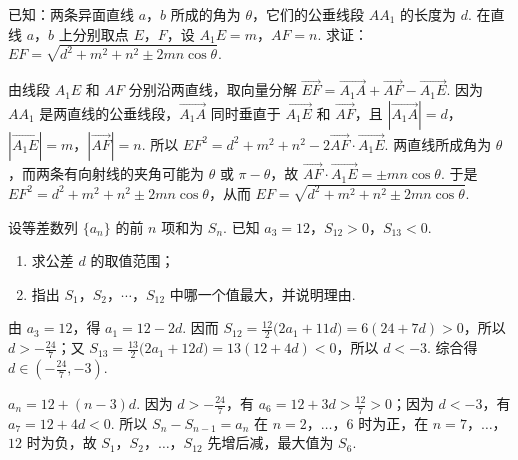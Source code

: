 \documentclass[UTF8,a4paper,oneside,11pt]{ctexbook}
\begin{document}
\begin{problem}
已知：两条异面直线 \(a\)，\(b\) 所成的角为 \(\theta\)，它们的公垂线段 \(AA_1\) 的长度为 \(d\). 在直线 \(a\)，\(b\) 上分别取点 \(E\)，\(F\)，设 \(A_1E=m\)，\(AF=n\). 求证：\(EF=\sqrt{d^2+m^2+n^2\pm 2mn\cos\theta}\).

\begin{solution}
由线段 \(A_1E\) 和 \(AF\) 分别沿两直线，取向量分解
\(\overrightarrow{EF}=\overrightarrow{A_1A}+\overrightarrow{AF}-\overrightarrow{A_1E}\). 因为 \(AA_1\) 是两直线的公垂线段，\(\overrightarrow{A_1A}\) 同时垂直于 \(\overrightarrow{A_1E}\) 和 \(\overrightarrow{AF}\)，且 \(|\overrightarrow{A_1A}|=d\)，\(|\overrightarrow{A_1E}|=m\)，\(|\overrightarrow{AF}|=n\). 所以
\(EF^2=d^2+m^2+n^2-2\overrightarrow{AF}\cdot\overrightarrow{A_1E}\). 两直线所成角为 \(\theta\)，而两条有向射线的夹角可能为 \(\theta\) 或 \(\pi-\theta\)，故 \(\overrightarrow{AF}\cdot\overrightarrow{A_1E}=\pm mn\cos\theta\). 于是 \(EF^2=d^2+m^2+n^2\pm2mn\cos\theta\)，从而 \(EF=\sqrt{d^2+m^2+n^2\pm2mn\cos\theta}\).
\end{solution}
\end{problem}

\begin{problem}
设等差数列 \(\{a_n\}\) 的前 \(n\) 项和为 \(S_n\). 已知 \(a_3=12\)，\(S_{12}>0\)，\(S_{13}<0\).

\begin{enumerate}
\item 求公差 \(d\) 的取值范围；
\item 指出 \(S_1\)，\(S_2\)，\(\cdots\)，\(S_{12}\) 中哪一个值最大，并说明理由.
\end{enumerate}

\begin{solution}
由 \(a_3=12\)，得 \(a_1=12-2d\). 因而
\(S_{12}=\frac{12}{2}\bigl(2a_1+11d\bigr)=6(24+7d)>0\)，所以 \(d>-\frac{24}{7}\)；又
\(S_{13}=\frac{13}{2}\bigl(2a_1+12d\bigr)=13(12+4d)<0\)，所以 \(d<-3\). 综合得 \(d\in\left(-\frac{24}{7},-3\right)\).

\(a_n=12+(n-3)d\). 因为 \(d>-\frac{24}{7}\)，有 \(a_6=12+3d>\frac{12}{7}>0\)；因为 \(d<-3\)，有 \(a_7=12+4d<0\). 所以 \(S_n-S_{n-1}=a_n\) 在 \(n=2\)，\(\ldots\)，\(6\) 时为正，在 \(n=7\)，\(\ldots\)，\(12\) 时为负，故 \(S_1\)，\(S_2\)，\(\ldots\)，\(S_{12}\) 先增后减，最大值为 \(S_6\).
\end{solution}
\end{problem}
\end{document}
